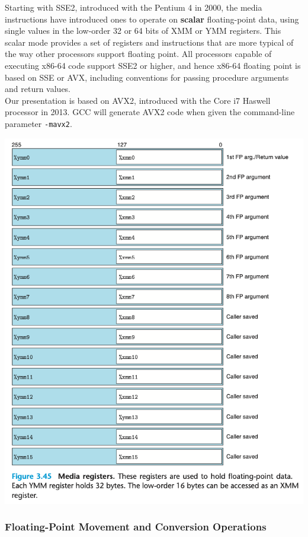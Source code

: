 \documentclass[11pt]{article}
\begin{document}
Starting with SSE2, introduced with the Pentium 4 in 2000, the media instructions have introduced ones to operate on \textbf{scalar} floating-point data, using single values in the low-order 32 or 64 bits of XMM or YMM registers. This scalar mode provides a set of registers and instructions that are more typical of the way other processors support floating point. All processors capable of executing x86-64 code support SSE2 or higher, and hence x86-64 floating point is based on SSE or AVX, including conventions for passing procedure arguments and return values.\\


Our presentation is based on AVX2, introduced with the Core i7 Haswell processor in 2013. GCC will generate AVX2 code when given the command-line parameter \texttt{-mavx2}.\\


\begin{center}
\includegraphics[width=.9\linewidth]{pics/media-registers.png}
\end{center}

\subsubsection{Floating-Point Movement and Conversion Operations}
\label{sec:orgb3bfbfe}
\end{document}
